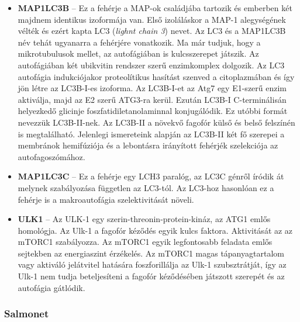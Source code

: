 \documentclass[a4paper,12pt]{article}
\begin{document}
\begin{itemize}
					\item \textbf{MAP1LC3B} -- Ez a fehérje a MAP-ok családjába tartozik és emberben két majdnem identikus izoformája van. Első izoláláskor a MAP-1 alegységének vélték és ezért kapta LC3 (\textit{lighnt chain 3}) nevet. Az LC3 és a MAP1LC3B név tehát ugyanarra a fehérjére vonatkozik. Ma már tudjuk, hogy a mikrotubulusok mellet, az autofágiában is kulcsszerepet játszik. \cite{atg8_like} Az autofágiában két ubikvitin rendszer szerű enzimkomplex dolgozik. Az LC3 autofágia indukciójakor proteolítikus hasítást szenved a citoplazmában és így jön létre az LC3B-I-es izoforma. Az LC3B-I-et az Atg7 egy E1-szerű enzim aktiválja, majd az E2 szerű ATG3-ra kerül. Ezután LC3B-I C-terminálisán helyezkedő glicinje foszfatidiletanolaminnal konjugálódik. Ez utóbbi formát nevezzük LC3B-II-nek. Az LC3B-II a növekvő fagofór külső és belső felszínén is megtalálható. Jelenlegi ismereteink alapján az LC3B-II két fő szerepei a membránok hemifúziója és a lebontásra irányított fehérjék szelekciója az autofagoszómához. \cite{autophagy_proteins}
					
					\item \textbf{MAP1LC3C} -- Ez a fehérje egy LCH3 paralóg, az LC3C génről íródik át melynek szabályozása független az LC3-tól. Az LC3-hoz hasonlóan ez a fehérje is a makroautofágia szelektivitását növeli.\cite{atg8_like}
					
					\item \textbf{ULK1} -- Az ULK-1 egy szerin-threonin-protein-kináz, az ATG1 emlős homológja. Az Ulk-1 a fagofór kéződés egyik kulcs faktora. Aktivitását az az mTORC1 szabályozza. Az mTORC1 egyik legfontosabb feladata emlős sejtekben az energiaszint érzékelés. Az mTORC1 magas tápanyagtartalom vagy aktiváló jelátvitel hatására foszforillálja az Ulk-1 szubsztrátját, így az Ulk-1 nem tudja beteljesíteni a fagofór kéződésében játszott szerepét és az autofágia gátlódik. \cite{autophagy_proteins}
				\end{itemize}
				
		
		\subsubsection{Salmonet}
		
\end{document}
